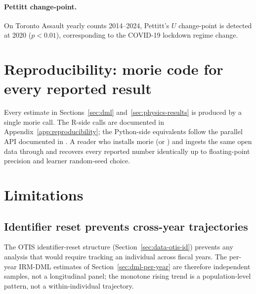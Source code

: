 \documentclass[article,shortnames,nojss]{jss}
\newcommand{\OTIS}{\textsf{OTIS}}
\begin{document}

\paragraph{Pettitt change-point.}  On Toronto Assault yearly counts
2014--2024, Pettitt's $U$ change-point is detected at 2020
($p<0.01$), corresponding to the COVID-19 lockdown regime change.



\section{Reproducibility: morie code for every reported result}
\label{sec:reproducibility}

Every estimate in Sections~\ref{sec:dml} and~\ref{sec:physics-results} is produced by a single morie call. The R-side
calls are documented in Appendix~\ref{app:reproducibility}; the
Python-side equivalents follow the parallel API documented in
\citet{Ruhela2026MoriePy}. A reader who installs morie
 (or ) and
ingests the same open data through 
and  recovers every reported number
identically up to floating-point precision and learner random-seed
choice.

\section{Limitations}
\label{sec:limitations}

\subsection{Identifier reset prevents cross-year trajectories}

The \OTIS{} identifier-reset structure (Section~\ref{sec:data-otis-id})
prevents any analysis that would require tracking an individual
across fiscal years. The per-year IRM-DML estimates of
Section~\ref{sec:dml-per-year} are therefore independent samples,
not a longitudinal panel; the monotone rising trend is a
population-level pattern, not a within-individual trajectory.
\end{document}

